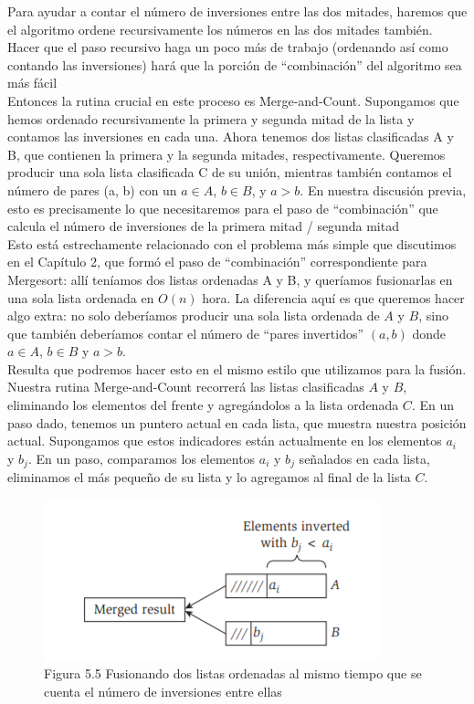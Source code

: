 \documentclass[a4paper, 12pt]{book}
\theoremstyle{dotless}
\begin{document}
Para ayudar a contar el número de inversiones entre las dos mitades, haremos que el algoritmo ordene recursivamente los números en las dos mitades también. Hacer que el paso recursivo haga un poco más de trabajo (ordenando así como contando las inversiones) hará que la porción de ``combinación'' del algoritmo sea más fácil\\

Entonces la rutina crucial en este proceso es Merge-and-Count. Supongamos que hemos ordenado recursivamente la primera y segunda mitad de la lista y contamos las inversiones en cada una. Ahora tenemos dos listas clasificadas A y B, que contienen la primera y la segunda mitades, respectivamente. Queremos producir una sola lista clasificada C de su unión, mientras también contamos el número de pares (a, b) con un $a \in A$, $b \in B$, y $a>b$. En nuestra discusión previa, esto es precisamente lo que necesitaremos para el paso de ``combinación'' que calcula el número de inversiones de la primera mitad / segunda mitad\\

Esto está estrechamente relacionado con el problema más simple que discutimos en el Capítulo 2, que formó el paso de ``combinación'' correspondiente para Mergesort: allí teníamos dos listas ordenadas A y B, y queríamos fusionarlas en una sola lista ordenada en $O(n)$ hora. La diferencia aquí es que queremos hacer algo extra: no solo deberíamos producir una sola lista ordenada de $A$ y $B$, sino que también deberíamos contar el número de ``pares invertidos'' $(a, b)$ donde $a \in A$, $b \in B$ y $a> b$.\\

Resulta que podremos hacer esto en el mismo estilo que utilizamos para la fusión. Nuestra rutina Merge-and-Count recorrerá las listas clasificadas $A$ y $B$, eliminando los elementos del frente y agregándolos a la lista ordenada $C$. En un paso dado, tenemos un puntero actual en cada lista, que muestra nuestra posición actual. Supongamos que estos indicadores están actualmente en los elementos $a_i$ y $b_j$. En un paso, comparamos los elementos $a_i$ y $b_j$ señalados en cada lista, eliminamos el más pequeño de su lista y lo agregamos al final de la lista $C$.\\

\begin{figure}[h]
\centering
\includegraphics[scale=1.4]{Imagenes-Seccion5/fig5_5.PNG}
\caption{Figura 5.5 Fusionando dos listas ordenadas al mismo tiempo que se cuenta el número de inversiones entre ellas}
\end{figure}
\end{document}
